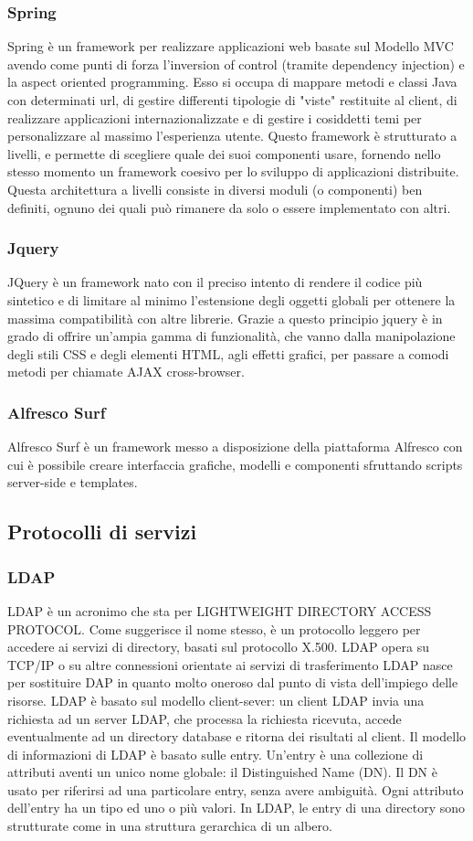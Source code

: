 \subsubsection{Spring}
Spring è un framework per realizzare applicazioni web basate sul Modello MVC
avendo come punti di forza l’inversion of control (tramite dependency injection) e la
aspect oriented programming. Esso si occupa di mappare metodi e classi Java con
determinati url, di gestire differenti tipologie di "viste" restituite al client, di realizzare
applicazioni internazionalizzate e di gestire i cosiddetti temi per personalizzare al
massimo l’esperienza utente. Questo framework è strutturato a livelli, e permette di
scegliere quale dei suoi componenti usare, fornendo nello stesso momento un framework
coesivo per lo sviluppo di applicazioni distribuite. Questa architettura a livelli consiste
in diversi moduli (o componenti) ben definiti, ognuno dei quali può rimanere da solo o
essere implementato con altri.
\subsubsection{Jquery}
JQuery è un framework nato con il preciso intento di rendere il codice più sintetico
e di limitare al minimo l’estensione degli oggetti globali per ottenere la massima
compatibilità con altre librerie. Grazie a questo principio jquery è in grado di offrire
un’ampia gamma di funzionalità, che vanno dalla manipolazione degli stili CSS e degli
elementi HTML, agli effetti grafici, per passare a comodi metodi per chiamate AJAX
cross-browser.
\subsubsection{Alfresco Surf}
Alfresco Surf è un framework messo a disposizione della piattaforma Alfresco con cui è
possibile creare interfaccia grafiche, modelli e componenti sfruttando scripts server-side
e templates.
\subsection{Protocolli di servizi}
\subsubsection{LDAP}
LDAP è un acronimo che sta per LIGHTWEIGHT DIRECTORY ACCESS
PROTOCOL. Come suggerisce il nome stesso, è un protocollo leggero per accedere
ai servizi di directory, basati sul protocollo X.500. LDAP opera su TCP/IP o su altre
connessioni orientate ai servizi di trasferimento LDAP nasce per sostituire DAP in
quanto molto oneroso dal punto di vista dell’impiego delle risorse. LDAP è basato
sul modello client-sever: un client LDAP invia una richiesta ad un server LDAP, che
processa la richiesta ricevuta, accede eventualmente ad un directory database e ritorna
dei risultati al client.
Il modello di informazioni di LDAP è basato sulle entry. Un’entry è una collezione di
attributi aventi un unico nome globale: il Distinguished Name (DN). Il DN è usato
per riferirsi ad una particolare entry, senza avere ambiguità.
Ogni attributo dell’entry ha un tipo ed uno o più valori.
In LDAP, le entry di una directory sono strutturate come in una struttura gerarchica
di un albero.
